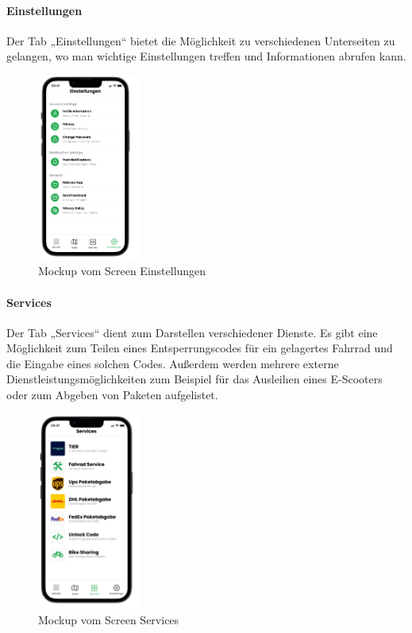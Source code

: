\paragraph{Einstellungen}Der \Gls{Tab} „Einstellungen“ bietet die Möglichkeit zu verschiedenen Unterseiten zu gelangen, wo man wichtige Einstellungen treffen und Informationen abrufen kann.\\
\begin{figure}[H]
  \centering
  \includegraphics[width=0.3\textwidth]{images/app_mock_settings}
  \caption{\Gls{Mockup} vom Screen Einstellungen}
  \label{fig:screensettingsmock}
\end{figure}

\paragraph{Services}Der \Gls{Tab} „Services“ dient zum Darstellen verschiedener Dienste. Es gibt eine Möglichkeit zum Teilen eines Entsperrungscodes für ein gelagertes Fahrrad und die Eingabe eines solchen Codes. Außerdem werden mehrere externe Dienstleistungsmöglichkeiten zum Beispiel für das Ausleihen eines E-Scooters oder zum Abgeben von Paketen aufgelistet.\\
\begin{figure}[H]
  \centering
  \includegraphics[width=0.3\textwidth]{images/app_mock_services}
  \caption{\Gls{Mockup} vom Screen Services}
  \label{fig:screenservicesmock}
\end{figure}


